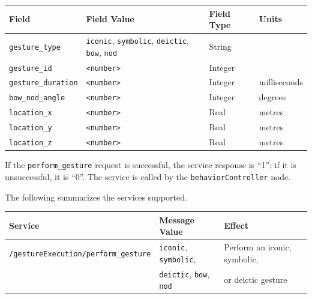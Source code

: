 \documentclass{CSSRforAfrica}
\begin{document}
{{\begin{center}
\begin{tabularx}{\linewidth}{| l | X | l| l|}
\hline 
{\small Field }                                                                                & {\small Field Value}    &  {\small Field Type}  &     {\small Units}   \\
\hline
{\footnotesize  \verb+gesture_type+}  & {\footnotesize \verb+iconic+,   \verb+symbolic+, \verb+deictic+, \verb+bow+, \verb+nod+   } & {\small String} & \\ 
\hline
{\footnotesize  \verb+gesture_id+}  & {\footnotesize \verb+<number>+    } & {\small Integer}  & \\ 
\hline
{\footnotesize  \verb+gesture_duration+}  & {\footnotesize \verb+<number>+    } & {\small Integer} & {\footnotesize milliseconds} \\ 
\hline
{\footnotesize  \verb+bow_nod_angle+}  & {\footnotesize \verb+<number>+    } & {\small Integer} & {\small degrees} \\ 
\hline
{\footnotesize  \verb+location_x+}  & {\footnotesize \verb+<number>+    } & {\small Real} & {\small metres} \\ 
\hline
{\footnotesize  \verb+location_y+}  & {\footnotesize \verb+<number>+    } & {\small Real} & {\small metres} \\ 
\hline
{\footnotesize  \verb+location_z+}  & {\footnotesize \verb+<number>+    } & {\small Real} & {\small metres} \\ 
\hline
\end{tabularx}
\end{center}

If the {\small \verb+perform_gesture+} request is successful, the service response is ``1''; if it is unsuccessful, it is ``0''.  
The service  is called by  the {\small \verb+behaviorController+} node.
 
The following summarizes the services supported.

\begin{center}
\begin{tabularx}{\linewidth}{| l | l | X|}
\hline 
{\small Service }                                                                                & {\small Message Value}    &  {\small Effect}       \\
\hline
{\footnotesize \verb+/gestureExecution/perform_gesture+ }  & {\footnotesize \verb+iconic+,   \verb+symbolic+,   } & {\small Perform an iconic, symbolic, } \\ 
  & {\footnotesize  \verb+deictic+, \verb+bow+, \verb+nod+ } &    or deictic gesture \\ 
\hline
\end{tabularx}
\end{center}



}}
\end{document}
